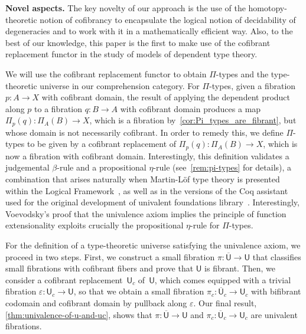 \documentclass[reqno,10pt,a4paper,oneside,draft]{amsart}
\numberwithin{equation}{section}
\theoremstyle{mythm}
\theoremstyle{mydef}
\theoremstyle{myrmk}
\newcommand{\co}{\colon}
\newcommand{\UU}{\overline{\mathsf{U}}}
\newcommand{\U}{\mathsf{U}}
\begin{document}
\smallskip

\noindent
\textbf{Novel aspects.} The key novelty of our approach is the use of the homotopy-theoretic notion of cofibrancy to encapsulate the logical notion of decidability of degeneracies and to work with it in a 
mathematically efficient way. Also, to the best of our knowledge, this paper is the first to make use of the cofibrant replacement functor in the study of models of dependent type theory.

We will use the cofibrant  replacement functor
to obtain $\Pi$-types and the type-theoretic universe in our comprehension category.  For $\Pi$-types, given a fibration $p \co A \to X$ with cofibrant domain, the result of applying the dependent product along $p$ to a fibration $q \co B \to A$ with cofibrant domain produces a map  $\Pi_p(q) \co \Pi_A(B) \to X$, which is a fibration by~\cref{cor:Pi_types_are_fibrant}, but whose domain
is not necessarily cofibrant. In order to remedy this, we define  $\Pi$-types to be given by a cofibrant replacement of
$\Pi_p(q) \co \Pi_A(B) \to X$, which is now a fibration with cofibrant domain. 
Interestingly, this definition validates
a judgemental $\beta$-rule and a propositional $\eta$-rule (see~\cref{rem:pi-types} for details), a combination that arises naturally when  Martin-L\"of type theory is presented
within the Logical Framework~\cite{nordstrom-petersson-smith:ml,GarnerR:strdp}, as well as in
the versions of the Coq assistant used for the original development of  univalent foundations
library~\cite{voevodsky:library}. Interestingly, Voevodsky's proof that the univalence axiom implies the principle of function extensionality exploits crucially the propositional $\eta$-rule for $\Pi$-types. 

For the definition of a  type-theoretic universe satisfying the univalence axiom, we proceed
in two steps. First, we construct a small fibration $\pi \co \UU \to \U$ that classifies small fibrations with cofibrant fibers and prove that $\U$ is fibrant. 
Then, we consider a cofibrant replacement~$\U_c$ of~$\U$, which comes equipped with a trivial fibration $\varepsilon \co \U_c \to \U$, so that 
we obtain a small fibration $\pi_c \co \UU_c \to \U_c$ with bifibrant codomain and cofibrant domain by pullback along $\varepsilon$. Our final result, \cref{thm:univalence-of-u-and-uc}, shows that
$\pi \co \UU \to \U$ and $\pi_c \co \UU_c \to \U_c$ are univalent fibrations. 
\end{document}
